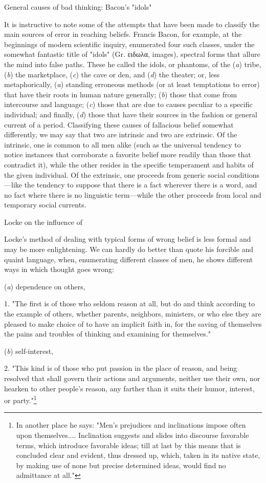 \documentclass[letterpaper]{book}
\begin{document}
General causes of bad thinking: Bacon's "idols"

It is instructive to note some of the attempts that have been made to
classify the main sources of error in reaching beliefs. Francis Bacon,
for example, at the beginnings of modern scientific inquiry, enumerated
four such classes, under the somewhat fantastic title of "idols" (Gr.
\textgreek{ειδωλα}, images), spectral forms that allure the mind into
false paths. These he called the idols, or phantoms, of the (\emph{a})
tribe, (\emph{b}) the marketplace, (\emph{c}) the cave or den, and
(\emph{d}) the theater; or, less metaphorically, (\emph{a}) standing
erroneous methods (or at least temptations to error) that have their
roots in human nature generally; (\emph{b}) those that come from
intercourse and language; (\emph{c}) those that are due to causes
peculiar to a specific individual; and finally, (\emph{d}) those that
have their sources in the fashion or general current of a period.
Classifying these causes of fallacious belief somewhat differently, we
may say that two are intrinsic and two are extrinsic. Of the intrinsic,
one is common to all men alike (such as the universal tendency to notice
instances that corroborate a favorite belief more readily than those
that contradict it), while the other resides in the specific temperament
and habits of the given individual. Of the extrinsic, one proceeds from
generic social conditions---like the tendency to suppose that there is a
fact wherever there is a word, and no fact where there is no linguistic
term---while the other proceeds from local and temporary social
currents.

Locke on the influence of

Locke's method of dealing with typical forms of wrong belief is less
formal and may be more enlightening. We can hardly do better than quote
his forcible and quaint language, when, enumerating different classes of
men, he shows different ways in which thought goes
wrong:

(\emph{a}) dependence on others,

1. "The first is of those who seldom reason at all, but do and think
according to the example of others, whether parents, neighbors,
ministers, or who else they are pleased to make choice of to have an
implicit faith in, for the saving of themselves the pains and troubles
of thinking and examining for themselves."

(\emph{b}) self-interest,

2. "This kind is of those who put passion in the place of reason, and
being resolved that shall govern their actions and arguments, neither
use their own, nor hearken to other people's reason, any farther than it
suits their humor, interest, or
party."\footnote{In another place he says: "Men's prejudices and inclinations impose
often upon themselves.... Inclination suggests and slides into discourse
favorable terms, which introduce favorable ideas; till at last by this
means that is concluded clear and evident, thus dressed up, which, taken
in its native state, by making use of none but precise determined ideas,
would find no admittance at all."
}
\end{document}
